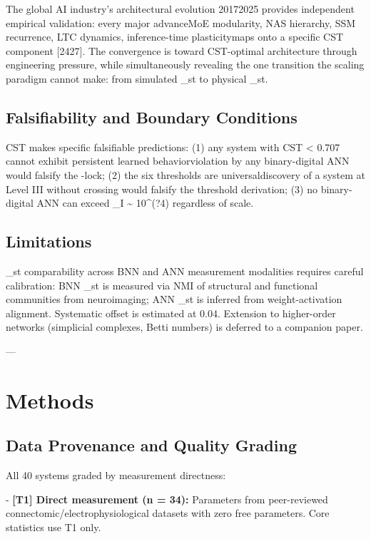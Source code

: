 \documentclass[a4paper,12pt]{article}
\begin{document}
The global AI industry's architectural evolution 20172025 provides independent empirical validation: every major advanceMoE modularity, NAS hierarchy, SSM recurrence, LTC dynamics, inference-time plasticitymaps onto a specific CST component [2427]. The convergence is toward CST-optimal architecture through engineering pressure, while simultaneously revealing the one transition the scaling paradigm cannot make: from simulated _st to physical _st.


\subsection{Falsifiability and Boundary Conditions}

CST makes specific falsifiable predictions: (1) any system with CST < 0.707 cannot exhibit persistent learned behaviorviolation by any binary-digital ANN would falsify the -lock; (2) the six thresholds are universaldiscovery of a system at Level III without crossing  would falsify the threshold derivation; (3) no binary-digital ANN can exceed _I \textasciitilde{} 10^(?4) regardless of scale.


\subsection{Limitations}

_st comparability across BNN and ANN measurement modalities requires careful calibration: BNN _st is measured via NMI of structural and functional communities from neuroimaging; ANN _st is inferred from weight-activation alignment. Systematic offset is estimated at 0.04. Extension to higher-order networks (simplicial complexes, Betti numbers) is deferred to a companion paper.


---


\section{Methods}

\subsection{Data Provenance and Quality Grading}

All 40 systems graded by measurement directness:


- \textbf{[T1] Direct measurement (n = 34):} Parameters from peer-reviewed connectomic/electrophysiological datasets with zero free parameters. Core statistics use T1 only.
\end{document}
